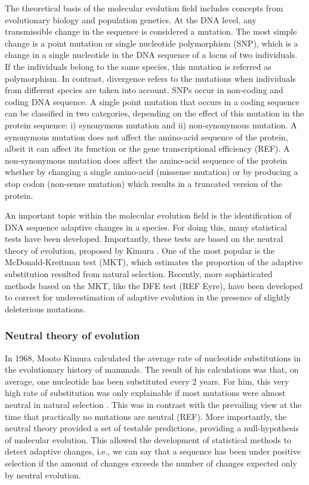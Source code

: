 The theoretical basis of the molecular evolution field includes concepts from evolutionary biology and population genetics. At the DNA level, any transmissible change in the sequence is considered a mutation. 
The most simple change is a point mutation or single nucleotide polymorphism (SNP),
which is a change in a single nucleotide in the DNA sequence of a locus of two individuals. 
If the individuals belong to the same species, this mutation is referred as polymorphism. In contrast, divergence refers to the mutations when individuals from different species are taken into account. 
SNPs occur in non-coding and coding DNA sequence. A single point mutation that occurs in a coding sequence can be classified in two categories, depending on the effect of this mutation in the protein sequence: i) synonymous mutation and ii) non-synonymous mutation.
A synonymous mutation does not affect the amino-acid sequence of the protein, albeit it can affect its function 
	\citep{Kimchi-Sarfaty2007}
or the gene transcriptional efficiency (REF).
A non-synonymous mutation does affect the amino-acid sequence of the protein whether by changing a single amino-acid (missense mutation) or by producing a stop codon (non-sense mutation) which results in a truncated version of the protein.


An important topic within the molecular evolution field is the identification of DNA sequence adaptive changes in a species. 
For doing this, many statistical tests have been developed. 
Importantly, these tests are based on the neutral theory of evolution, proposed by Kimura
	\citep{Kimura1968}.
One of the most popular is the McDonald-Kreitman test (MKT),
which estimates the proportion of the adaptive substitution resulted from natural selection. 
Recently, more sophisticated methods based on the MKT, like the DFE test (REF Eyre), have been developed to correct for underestimation of adaptive evolution in the presence of slightly deleterious mutations.

\subsubsection{Neutral theory of evolution}
In 1968, Mooto Kimura calculated the average rate of nucleotide substitutions in the evolutionary history of mammals.
The result of his calculations was that, on average, one nucleotide has been substituted every 2 years.
For him, this very high rate of substitution was only explainable if most mutations were almost neutral in natural selection 
	\citep{Kimura1968}.
This was in contrast with the prevailing view at the time that practically no mutations are neutral (REF).
More importantly, the neutral theory provided a set of testable predictions, providing a null-hypothesis of molecular evolution.
This allowed the development of statistical methods to detect adaptive changes, i.e., we can say that a sequence has been under positive selection if the amount of changes exceeds the number of changes expected only by neutral evolution.


